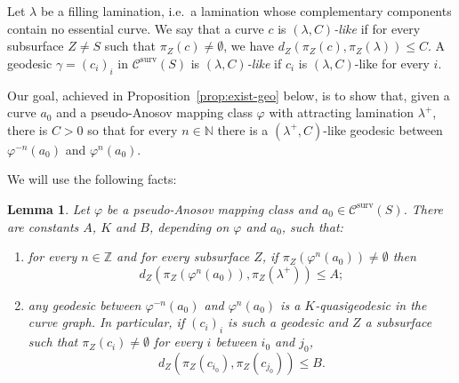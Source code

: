 \documentclass{amsart}
\newcommand{\Z}{\mathbb{Z}}
\newcommand{\N}{\mathbb{N}}
\newcommand{\C}{\mathcal{C}}
\newcommand{\dist}{d}
\newcommand{\Csurv}{\C^{\text{surv}}}
\newtheorem{lemma}[thm]{Lemma}
\theoremstyle{definition}
\begin{document}
Let \(\lambda\) be a filling lamination, i.e.\ a lamination whose complementary components contain no essential curve. We say that a curve \(c\) is \emph{\((\lambda,C)\)-like} if for every subsurface \(Z \neq S\) such that \(\pi_Z(c)\neq \emptyset\), we have \(\dist
_Z(\pi_Z(c),\pi_Z(\lambda))\leq C\). A geodesic \(\gamma=(c_i)_i\) in \(\Csurv(S)\) is \emph{\((\lambda,C)\)-like} if \(c_i\) is \((\lambda,C)\)-like for every \(i\).

Our goal, achieved in Proposition~\ref{prop:exist-geo} below, is to show that, given a curve \(a_0\) and a pseudo-Anosov mapping class \(\varphi\) with attracting lamination \(\lambda^+\), there is \(C>0\) so that for every \(n\in \N\) there is a \((\lambda^+,C)\)-like geodesic between \(\varphi^{-n}(a_0)\) and \(\varphi^n(a_0)\).

We will use the following facts:

\begin{lemma}\label{lem:geodesics-between-iterates}
Let \(\varphi\) be a pseudo-Anosov mapping class and \(a_0\in\Csurv(S)\). 
There are constants \(A\), \(K\) and $B$, depending on \(\varphi\) and \(a_0\), such that:
\begin{enumerate}
\item  for every \(n\in\Z\) and for every subsurface \(Z\), if $\pi_Z(\varphi^n(a_0)) \neq \emptyset$ then
\[\dist_Z(\pi_Z(\varphi^n(a_0)),\pi_Z(\lambda^+))\leq A;\]
\item  any geodesic between \(\varphi^{-n}(a_0)\) and \(\varphi^n(a_0)\) is a \(K\)-quasigeodesic in the curve graph. In particular, if \((c_i)_i\) is such a geodesic and \(Z\) a subsurface such that \(\pi_Z(c_i)\neq \emptyset\) for every \(i\) between \(i_0\) and \(j_0\),
\[\dist_Z(\pi_Z(c_{i_0}),\pi_Z(c_{j_0}))\leq B.\]
\end{enumerate}
\end{lemma}
\end{document}
